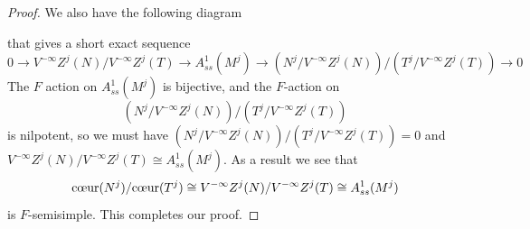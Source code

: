 \documentclass[a4paper,12pt,twoside]{report}
\newtheorem{lemma}[theorem]{Lemma}
\begin{document}
\begin{proof}
We also have the following diagram 
\begin{center}
\end{center}
that gives a short exact sequence 
\[0\rightarrow V^{-\infty}Z^j(N)/V^{-\infty}Z^j(T)\rightarrow A^1_{ss}(M^j)\rightarrow (N^j/V^{-\infty}Z^j(N))/(T^j/V^{-\infty}Z^j(T))\rightarrow 0\]
The $F$ action on $A^1_{ss}(M^j)$ is bijective, and the $F$-action on \[(N^j/V^{-\infty}Z^j(N))/(T^j/V^{-\infty}Z^j(T))\] is nilpotent, so 
we must have  $(N^j/V^{-\infty}Z^j(N))/(T^j/V^{-\infty}Z^j(T))=0$ and  $V^{-\infty}Z^j(N)/V^{-\infty}Z^j(T)\cong A^1_{ss}(M^j)$. 
As a result we see that
$$\text{\rm {c\oe ur}}(N^j)/\text{\rm {c\oe ur}}(T^j)\cong V^{-\infty}Z^j(N)/V^{-\infty}Z^j(T)\cong A^1_{ss}(M^j)$$ is $F$-semisimple. 
This completes our proof.
\end{proof}
    
    
    


\end{document}
